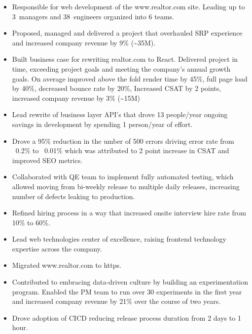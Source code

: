 \documentclass[11pt,a4paper,roman]{moderncv}       %
\begin{document}
{\begin{itemize}
    \item Responsible for web development of the www.realtor.com site. Leading up to 3~managers and 38~engineers organized into 6 teams.  
    \item Proposed, managed and delivered a project that overhauled SRP experience and increased company revenue by 9\% (\textasciitilde35M).
    \item Built business case for rewriting realtor.com to React. Delivered project in time, exceeding project goals and meeting the company's annual growth goals. On average improved above the fold render time by 45\%, full page load by 40\%, decreased bounce rate by 20\%, Increased CSAT by 2 points, increased company revenue by 3\% (\textasciitilde15M)
    \item Lead rewrite of business layer API's that drove 13 people/year ongoing savings in development by spending 1 person/year of effort.
    \item Drove a 95\% reduction in the umber of 500 errors driving error rate from ~0.2\% to ~0.01\% which was attributed to 2 point increase in CSAT and improved SEO metrics.
    \item Collaborated with QE team to implement fully automated testing, which allowed moving from bi-weekly release to multiple daily releases, increasing number of defects leaking to production.
    \item Refined hiring process in a way that increased onsite interview hire rate from 10\% to 60\%.
    \item Lead web technologies center of excellence, raising frontend technology expertise across the company.
    \item Migrated www.realtor.com to https.
    \item Contributed to embracing data-driven culture by building an experimentation program. Enabled the PM team to run over 30 experiments in the first year and increased company revenue by 21\% over the course of two years.
    \item Drove adoption of CICD reducing release process duration from 2 days to 1 hour.

\end{itemize}

\bigskip


}
\end{document}
